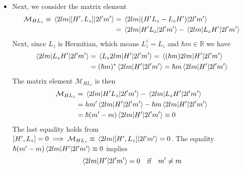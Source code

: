 \documentclass[11pt, a4paper]{article}
\begin{document}
\begin{itemize}
	\item Next, we consider the matrix element
	\begin{align*}
		\mathcal{M}_{HL_{z}} \equiv \mel{2lm}{[H', L_{z}]}{2l'm'} &= \mel{2lm}{(H' L_{z} - L_{z}H')}{2l'm'} \\
		& = \mel{2lm}{H'L_{z}}{2l'm'} - \mel{2lm}{L_{z}H'}{2l'm'}
	\end{align*}
	Next, since $ L_{z} $ is Hermitian, which means $ L_{z}^{\dagger} = L_{z} $ and $ \hbar m \in \mathbb{R} $ we have
	\begin{align*}
		\mel{2lm}{L_{z}H'}{2l'm'} & = \mel{L_{z}2lm}{H'}{2l'm'} = \mel{(\hbar m)2lm}{H'}{2l'm'} \\
		& = (\hbar m)^{*}\mel{2lm}{H'}{2l'm'} = \hbar m \mel{2lm}{H'}{2l'm'}
	\end{align*}
	The matrix element $ \mathcal{M}_{HL_{z}} $ is then
	\begin{align*}
		\mathcal{M}_{HL_{z}} &= \mel{2lm}{H'L_{z}}{2l'm'} - \mel{2lm}{L_{z}H'}{2l'm'} \\
		& = hm'\mel{2lm}{H'}{2l'm'} - \hbar m \mel{2lm}{H'}{2l'm'}\\
		& = \hbar(m' - m)\mel{2lm}{H'}{2l'm'} \equiv 0
	\end{align*}
	The last equality holds from $ [H', L_{z}] = 0 \implies \mathcal{M}_{HL_{z}} \equiv \mel{2lm}{[H', L_{z}]}{2l'm'} = 0 $. The equality $ \hbar(m' - m)\mel{2lm}{H'}{2l'm'} \equiv 0 $ implies
	\begin{equation*}
		\mel{2lm}{H'}{2l'm'} = 0 \quad \text{if} \quad 	m' \neq m 
	\end{equation*}


\end{itemize}
\end{document}
